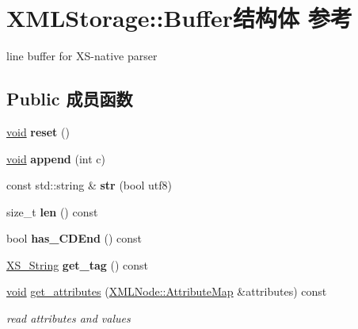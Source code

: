 \hypertarget{struct_x_m_l_storage_1_1_buffer}{}\section{X\+M\+L\+Storage\+:\+:Buffer结构体 参考}
\label{struct_x_m_l_storage_1_1_buffer}


line buffer for X\+S-\/native parser  


\subsection*{Public 成员函数}
\begin{DoxyCompactItemize}
\item 
\mbox{\label{struct_x_m_l_storage_1_1_buffer_a06104009dda3038b8d513acdec89c58b}} 
\hyperlink{interfacevoid}{void} {\bfseries reset} ()
\item 
\mbox{\label{struct_x_m_l_storage_1_1_buffer_a48ae7c72268cabf6ce6e02303caa1e3b}} 
\hyperlink{interfacevoid}{void} {\bfseries append} (int c)
\item 
\mbox{\label{struct_x_m_l_storage_1_1_buffer_a84dcb7203e0170c59b1a2b01a289a724}} 
const std\+::string \& {\bfseries str} (bool utf8)
\item 
\mbox{\label{struct_x_m_l_storage_1_1_buffer_ab0ba484d098119b2d376b3471c9b67d6}} 
size\+\_\+t {\bfseries len} () const
\item 
\mbox{\label{struct_x_m_l_storage_1_1_buffer_ac1eeafba220706597099394d2e6c1a7d}} 
bool {\bfseries has\+\_\+\+C\+D\+End} () const
\item 
\mbox{\label{struct_x_m_l_storage_1_1_buffer_aab0fa73e00e8067a5e3e97ee0f8ea5f8}} 
\hyperlink{struct_x_m_l_storage_1_1_x_s___string}{X\+S\+\_\+\+String} {\bfseries get\+\_\+tag} () const
\item 
\mbox{\label{struct_x_m_l_storage_1_1_buffer_a553a09698edfb95c7dc1939ce29a64ed}} 
\hyperlink{interfacevoid}{void} \hyperlink{struct_x_m_l_storage_1_1_buffer_a553a09698edfb95c7dc1939ce29a64ed}{get\+\_\+attributes} (\hyperlink{struct_x_m_l_storage_1_1_x_m_l_node_1_1_attribute_map}{X\+M\+L\+Node\+::\+Attribute\+Map} \&attributes) const
\begin{DoxyCompactList}\small\item\em read attributes and values \end{DoxyCompactList}\end{DoxyCompactItemize}
